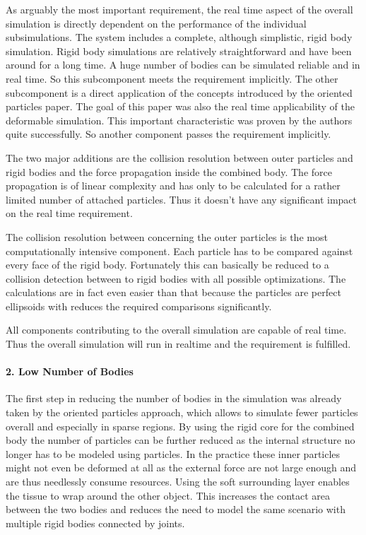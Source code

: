 As arguably the most important requirement, the real time aspect of the overall simulation is directly dependent on the performance of the individual subsimulations. The system includes a complete, although simplistic, rigid body simulation. Rigid body simulations are relatively straightforward and have been around for a long time. A huge number of bodies can be simulated reliable and in real time. So this subcomponent meets the requirement implicitly. The other subcomponent is a direct application of the concepts introduced by the oriented particles paper. The goal of this paper was also the real time applicability of the deformable simulation. This important characteristic was proven by the authors quite successfully. So another component passes the requirement implicitly. 

The two major additions are the collision resolution between outer particles and rigid bodies and the force propagation inside the combined body. The force propagation is of linear complexity and has only to be calculated for a rather limited number of attached particles. Thus it doesn't have any significant impact on the real time requirement.

The collision resolution between concerning the outer particles is the most computationally intensive component. Each particle has to be compared against every face of the rigid body. Fortunately this can basically be reduced to a collision detection between to rigid bodies with all possible optimizations. The calculations are in fact even easier than that because the particles are perfect ellipsoids with reduces the required comparisons significantly.

All components contributing to the overall simulation are capable of real time. Thus the overall simulation will run in realtime and the requirement is fulfilled.

\paragraph{2. Low Number of Bodies}

The first step in reducing the number of bodies in the simulation was already taken by the oriented particles approach, which allows to simulate fewer particles overall and especially in sparse regions. By using the rigid core for the combined body the number of particles can be further reduced as the internal structure no longer has to be modeled using particles. In the practice these inner particles might not even be deformed at all as the external force are not large enough and are thus needlessly consume resources. Using the soft surrounding layer enables the tissue to wrap around the other object. This increases the contact area between the two bodies and reduces the need to model the same scenario with multiple rigid bodies connected by joints.

